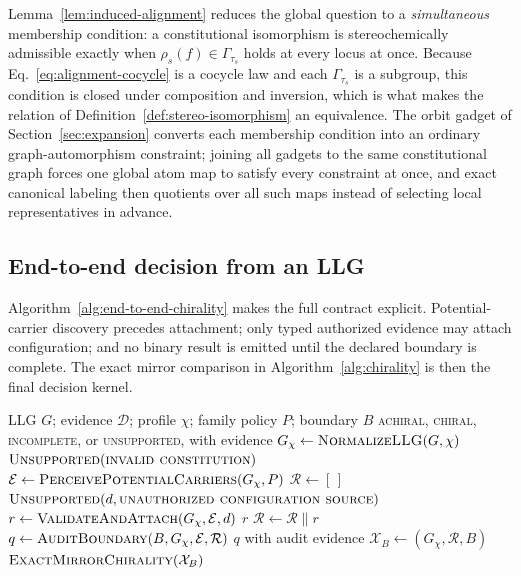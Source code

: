 \documentclass[pdflatex,sn-mathphys-num,referee,lineno]{sn-jnl}
\theoremstyle{plain}
\theoremstyle{remark}
\theoremstyle{definition}
\begin{document}
Lemma~\ref{lem:induced-alignment} reduces the global question to a
\emph{simultaneous} membership condition: a constitutional isomorphism is
stereochemically admissible exactly when \(\rho_s(f)\in\Gamma_{\tau_s}\) holds
at every locus at once.  Because Eq.~\eqref{eq:alignment-cocycle} is a cocycle
law and each \(\Gamma_{\tau_s}\) is a subgroup, this condition is closed under
composition and inversion, which is what makes the relation of
Definition~\ref{def:stereo-isomorphism} an equivalence.  The orbit gadget of
Section~\ref{sec:expansion} converts each membership condition into an ordinary
graph-automorphism constraint; joining all gadgets to the same constitutional
graph forces one global atom map to satisfy every constraint at once, and exact
canonical labeling then quotients over all such maps instead of selecting local
representatives in advance.


\subsection{End-to-end decision from an LLG}
\label{sec:end-to-end}

Algorithm~\ref{alg:end-to-end-chirality} makes the full contract explicit.
Potential-carrier discovery precedes attachment; only typed authorized evidence
may attach configuration; and no binary result is emitted until the declared
boundary is complete.  The exact mirror comparison in
Algorithm~\ref{alg:chirality} is then the final decision kernel.

\begin{algorithm}[htbp]
\caption{Fail-closed molecular chirality from Lewis-labeled input}
\label{alg:end-to-end-chirality}
\begin{algorithmic}[1]
\Require LLG \(G\); evidence \(\mathcal D\); profile \(\chi\); family policy \(P\); boundary \(B\)
\Ensure \textsc{achiral}, \textsc{chiral}, \textsc{incomplete}, or \textsc{unsupported}, with evidence
\State \(G_\chi\gets\Call{NormalizeLLG}{G,\chi}\)
  \State \Return \(\Call{Unsupported}{\textsc{invalid constitution}}\)
\EndIf
\State \(\mathcal E\gets\Call{PerceivePotentialCarriers}{G_\chi,P}\)
\State \(\mathcal R\gets[\,]\)
    \State \Return \(\Call{Unsupported}{d,\textsc{unauthorized configuration source}}\)
  \EndIf
  \State \(r\gets\Call{ValidateAndAttach}{G_\chi,\mathcal E,d}\)
   \State \Return \(r\) \EndIf
  \State \(\mathcal R\gets\mathcal R\mathbin{\|}r\)
\EndFor
\State \(q\gets\Call{AuditBoundary}{B,G_\chi,\mathcal E,\mathcal R}\)
 \State \Return \(q\) with audit evidence \EndIf
\State \(\mathcal X_B\gets(G_\chi,\mathcal R,B)\)
\State \Return \(\Call{ExactMirrorChirality}{\mathcal X_B}\)
\end{algorithmic}
\end{algorithm}
\end{document}
